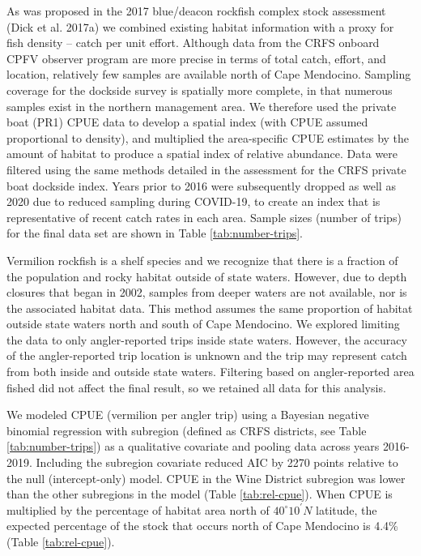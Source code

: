 \documentclass[
  english,
  a4paper,
]{article}
\begin{document}
As was proposed in the 2017 blue/deacon rockfish complex stock assessment (Dick et al. 2017a) we combined existing habitat information with a proxy for fish density -- catch per unit effort. Although data from the CRFS onboard CPFV observer
program are more precise in terms of total catch, effort, and location, relatively few
samples are available north of Cape Mendocino. Sampling coverage for the dockside
survey is spatially more complete, in that numerous samples exist in the northern
management area. We therefore used the private boat (PR1) CPUE data to develop a spatial
index (with CPUE assumed proportional to density), and multiplied the area-specific
CPUE estimates by the amount of habitat to produce a spatial index of relative abundance.
Data were filtered using the same methods detailed in the assessment for the CRFS
private boat dockside index. Years prior to 2016 were subsequently dropped as well as 2020 due to reduced sampling during COVID-19, to create an index that is representative of recent catch rates in each area. Sample sizes (number of trips) for the final data set are shown in Table \ref{tab:number-trips}.

Vermilion rockfish is a shelf species and we recognize that there is a fraction of the
population and rocky habitat outside of state waters. However, due to depth closures that began in 2002, samples from deeper waters are not available, nor is the associated habitat
data. This method assumes the same proportion of habitat outside state waters north and
south of Cape Mendocino. We explored limiting the data to only angler-reported trips inside state waters. However, the accuracy of the angler-reported trip location is unknown and the
trip may represent catch from both inside and outside state waters. Filtering based on
angler-reported area fished did not affect the final result, so we retained all data for this analysis.

We modeled CPUE (vermilion per angler trip) using a Bayesian negative binomial regression with subregion (defined as CRFS districts, see Table \ref{tab:number-trips}) as a qualitative covariate and
pooling data across years 2016-2019. Including the subregion covariate reduced AIC
by 2270 points relative to the null (intercept-only) model. CPUE in the Wine District subregion was lower than the other subregions in the model
(Table \ref{tab:rel-cpue}). When CPUE is multiplied by the percentage of habitat area north of $40^\circ 10^\prime N$ latitude, the expected percentage of the stock that occurs north of Cape Mendocino is 4.4\% (Table \ref{tab:rel-cpue}).
\end{document}
